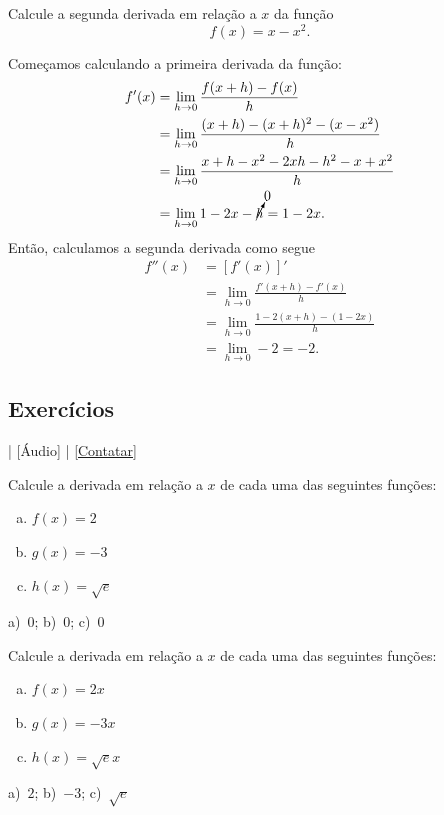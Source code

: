 \begin{exeresol}
  Calcule a segunda derivada em relação a $x$ da função
  \begin{equation}
    f(x) = x - x^2.
  \end{equation}
\end{exeresol}
\begin{resol}
  Começamos calculando a primeira derivada da função:
  \begin{align}
    f'(x) &= \lim_{h\to 0} \frac{f(x+h)-f(x)}{h} \\
          &= \lim_{h\to 0} \frac{(x+h)-(x+h)^2-(x-x^2)}{h} \\
          &= \lim_{h\to 0} \frac{x+h-x^2-2xh-h^2-x+x^2}{h} \\
          &= \lim_{h\to 0} 1-2x-\cancelto{0}{h} = 1 - 2x.
  \end{align}
  Então, calculamos a segunda derivada como segue
  \begin{align}
    f''(x) &= [f'(x)]' \\
           &= \lim_{h\to 0} \frac{f'(x+h)-f'(x)}{h} \\
           &= \lim_{h\to 0} \frac{1-2(x+h)-(1-2x)}{h} \\
           &= \lim_{h\to 0} -2 = -2.
  \end{align}
\end{resol}

\subsection*{Exercícios}

\begin{flushright}
  [Vídeo] | [Áudio] | \href{https://phkonzen.github.io/notas/contato.html}{[Contatar]}
\end{flushright}

\begin{exer}
  Calcule a derivada em relação a $x$ de cada uma das seguintes funções:
  \begin{enumerate}[a)]
  \item $f(x) = 2$
  \item $g(x) = -3$
  \item $h(x) = \sqrt{e}$
  \end{enumerate}
\end{exer}
\begin{resp}
  a)~$0$; b)~$0$; c)~$0$
\end{resp}

\begin{exer}
  Calcule a derivada em relação a $x$ de cada uma das seguintes funções:
  \begin{enumerate}[a)]
  \item $f(x) = 2x$
  \item $g(x) = -3x$
  \item $h(x) = \sqrt{e}x$
  \end{enumerate}
\end{exer}
\begin{resp}
  a)~$2$; b)~$-3$; c)~$\sqrt{e}$
\end{resp}

